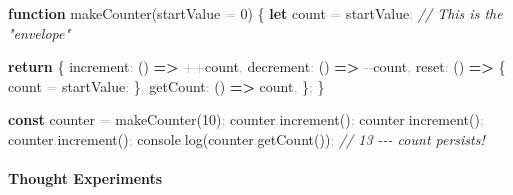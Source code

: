 \documentclass[
  justified,
  openright,
]{tufte-book}
\let\paragraph\paragraph
\newcommand{\KeywordTok}[1]{\textcolor{CodeKeyword}{\textbf{#1}}}  %
\newcommand{\CommentTok}[1]{\textcolor{CodeComment}{\textit{#1}}}  %
\newcommand{\CodeNumTok}[1]{\textcolor{CodeNumber}{#1}}             %
\newcommand{\CodeFuncTok}[1]{\textcolor{CodeKeyword}{#1}}           %
\newcommand{\CodeTypeTok}[1]{\textcolor{CodeType}{#1}}              %
\newcommand{\OperatorTok}[1]{\textcolor{DarkGray}{#1}}              %
\newenvironment{Shaded}{%
  \begin{mdframed}[style=TufteCode]%
}{%
  \end{mdframed}%
}
\let\paragraph\paragraph
\begin{document}
\begin{Shaded}
\begin{Highlighting}[]
\KeywordTok{function} \CodeFuncTok{makeCounter}(startValue \OperatorTok{=} \CodeNumTok{0}) \{
  \KeywordTok{let} count \OperatorTok{=} startValue\OperatorTok{;} \CommentTok{// This is the "envelope"}
 
  \KeywordTok{return} \{
    \CodeTypeTok{increment}\OperatorTok{:} () \KeywordTok{=\textgreater{}} \OperatorTok{++}count\OperatorTok{,}
    \CodeTypeTok{decrement}\OperatorTok{:} () \KeywordTok{=\textgreater{}} \OperatorTok{{-}{-}}count\OperatorTok{,}
    \CodeTypeTok{reset}\OperatorTok{:} () \KeywordTok{=\textgreater{}} \{
      count \OperatorTok{=} startValue\OperatorTok{;}
    \}\OperatorTok{,}
    \CodeTypeTok{getCount}\OperatorTok{:} () \KeywordTok{=\textgreater{}} count\OperatorTok{,}
  \}\OperatorTok{;}
\}
 
\KeywordTok{const} counter \OperatorTok{=} \CodeFuncTok{makeCounter}(\CodeNumTok{10})\OperatorTok{;}
counter\OperatorTok{.}\CodeFuncTok{increment}()\OperatorTok{;}
counter\OperatorTok{.}\CodeFuncTok{increment}()\OperatorTok{;}
counter\OperatorTok{.}\CodeFuncTok{increment}()\OperatorTok{;}
console\OperatorTok{.}\CodeFuncTok{log}(counter\OperatorTok{.}\CodeFuncTok{getCount}())\OperatorTok{;} \CommentTok{// 13 {-}{-}{-} count persists!}
\end{Highlighting}
\end{Shaded}

\paragraph{Thought Experiments}\label{thought-experiments-25}
\end{document}
